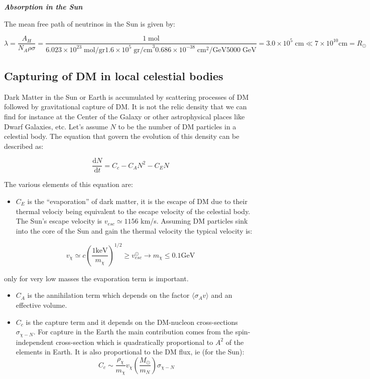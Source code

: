 \documentclass[
  letterpaper,
  DIV=11,
  numbers=noendperiod]{scrreprt}
\providecommand{\tightlist}{%
  \setlength{\itemsep}{0pt}\setlength{\parskip}{0pt}}\usepackage{longtable,booktabs,array}
\begin{document}
\textbf{\emph{Absorption in the Sun}}

The mean free path of neutrinos in the Sun is given by:

\[ \lambda = \frac{A_H}{N_A\rho \sigma} = \frac{ 1\; \mathrm{mol}}{6.023 \times 10^{23}\; \mathrm{mol/gr} 1.6 \times 10^5\; \mathrm{gr/cm}^3 0.686\times 10^{-38}\; \mathrm{cm}^{2}/\mathrm{GeV} 5000 \;\mathrm{GeV}} = 3.0 \times 10^5 \mathrm{\; cm} \ll 7 \times 10^{10} \mathrm{cm}  = R_\odot\]

\subsection{Capturing of DM in local celestial
bodies}\label{capturing-of-dm-in-local-celestial-bodies}

Dark Matter in the Sun or Earth is accumulated by scattering processes
of DM followed by gravitational capture of DM. It is not the relic
density that we can find for instance at the Center of the Galaxy or
other astrophysical places like Dwarf Galaxies, etc. Let's assume \(N\)
to be the number of DM particles in a celestial body. The equation that
govern the evolution of this density can be described as:

\[\frac{\mathrm{d} N}{\mathrm{d}t} = C_c - C_A N^2 - C_E N\]

The various elements of this equation are:

\begin{itemize}
\tightlist
\item
  \(C_E\) is the ``evaporation'' of dark matter, it is the escape of DM
  due to their thermal velociy being equivalent to the escape velocity
  of the celestial body. The Sun's escape velocity is
  \(v_{esc} \simeq 1156\) km/s. Assuming DM particles sink into the core
  of the Sun and gain the thermal velocity the typical velocity is:
\end{itemize}

\[v_\chi  \simeq c \left(\frac{1 \mathrm{keV}}{m_\chi}\right)^{1/2} \geq  v_{esc}^{\odot} \rightarrow m_\chi \leq 0.1 \mathrm{GeV} \]

only for very low masses the evaporation term is important.

\begin{itemize}
\item
  \(C_A\) is the annihilation term which depends on the factor
  \(\langle \sigma_A v \rangle\) and an effective volume.
\item
  \(C_c\) is the capture term and it depends on the DM-nucleon
  cross-sections \(\sigma_{\chi-N}\). For capture in the Earth the main
  contribution comes from the spin-independent cross-section which is
  quadratically proportional to \(A^2\) of the elements in Earth. It is
  also proportional to the DM flux, ie (for the Sun):
  \[ C_c \sim \frac{\rho_\chi}{m_\chi}v_\chi \left(\frac{M_\odot}{m_N}\right)\sigma_{\chi-N}\]
\end{itemize}
\end{document}
